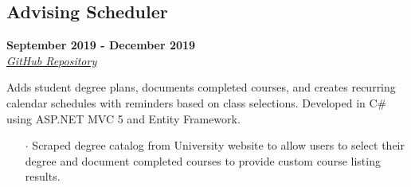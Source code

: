 \documentclass[10pt]{article}
\begin{document}
\vspace{-.4cm}

\begin{paracol}{2}
    \begin{leftcolumn} 
        \sloppy
        \subsection*{Advising Scheduler}
        \textbf{September 2019 - December 2019} \\
        \textit{\href{https://github.com/javiSauce/DBU-Advising-Scheduler}{\underline{GitHub Repository}}}
    \end{leftcolumn}
    \begin{rightcolumn} 
        \vspace{.2cm}
        \begin{flushleft} 
            Adds student degree plans, documents completed courses, and creates recurring calendar schedules with reminders based on class selections. Developed in C\# using ASP.NET MVC 5 and Entity Framework.
        \end{flushleft}
        \vspace{-.6cm}
        \begin{itemize}[leftmargin=.28cm, itemsep=1pt]
            \item[$\cdot$]  Scraped degree catalog from University website to allow users to select their degree and document completed courses to provide custom course listing results.
        \end{itemize}
    \end{rightcolumn}
\end{paracol}

\vspace{-.4cm}
\end{document}
